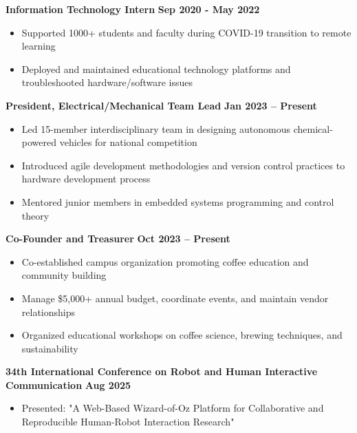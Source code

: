 \documentclass{article}
\begin{document}
 \hfill {}

\textbf{Information Technology Intern} \hfill \textbf{Sep 2020 - May 2022}
\begin{itemize}[noitemsep,topsep=2pt]
    \item Supported 1000+ students and faculty during COVID-19 transition to remote learning
    \item Deployed and maintained educational technology platforms and troubleshooted hardware/software issues
\end{itemize}


 \hfill {}

\textbf{President, Electrical/Mechanical Team Lead} \hfill \textbf{Jan 2023 – Present}
\begin{itemize}[noitemsep,topsep=2pt]
    \item Led 15-member interdisciplinary team in designing autonomous chemical-powered vehicles for national competition
    \item Introduced agile development methodologies and version control practices to hardware development process
    \item Mentored junior members in embedded systems programming and control theory
\end{itemize}

 \hfill {}

\textbf{Co-Founder and Treasurer} \hfill \textbf{Oct 2023 – Present}
\begin{itemize}[noitemsep,topsep=2pt]
    \item Co-established campus organization promoting coffee education and community building
    \item Manage \$5,000+ annual budget, coordinate events, and maintain vendor relationships
    \item Organized educational workshops on coffee science, brewing techniques, and sustainability
\end{itemize}


 \hfill {}

\textbf{34th International Conference on Robot and Human Interactive Communication} \hfill \textbf{Aug 2025}
\begin{itemize}[noitemsep,topsep=2pt]
    \item Presented: "A Web-Based Wizard-of-Oz Platform for Collaborative and Reproducible Human-Robot Interaction Research"
\end{itemize}
\end{document}
